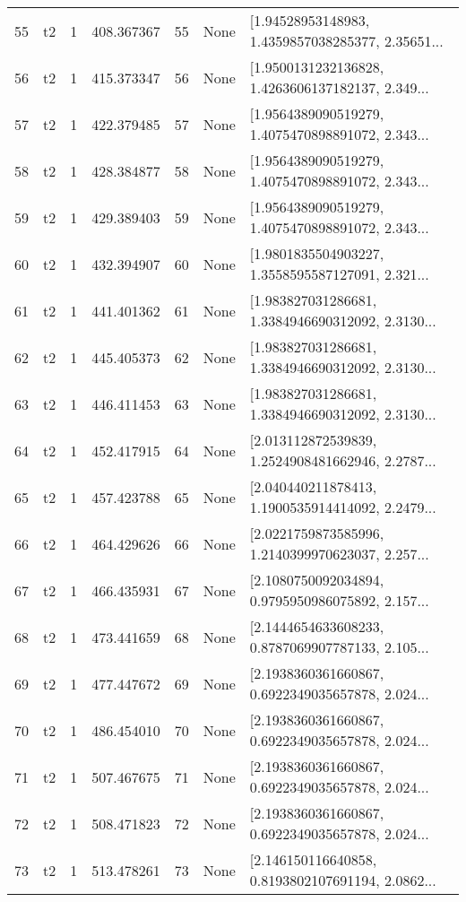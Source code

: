 \begin{tabular}{lllrlll}
55  &  t2 &   1 &   408.367367 &   55 &  None &  [1.94528953148983, 1.4359857038285377, 2.35651... \\
56  &  t2 &   1 &   415.373347 &   56 &  None &  [1.9500131232136828, 1.4263606137182137, 2.349... \\
57  &  t2 &   1 &   422.379485 &   57 &  None &  [1.9564389090519279, 1.4075470898891072, 2.343... \\
58  &  t2 &   1 &   428.384877 &   58 &  None &  [1.9564389090519279, 1.4075470898891072, 2.343... \\
59  &  t2 &   1 &   429.389403 &   59 &  None &  [1.9564389090519279, 1.4075470898891072, 2.343... \\
60  &  t2 &   1 &   432.394907 &   60 &  None &  [1.9801835504903227, 1.3558595587127091, 2.321... \\
61  &  t2 &   1 &   441.401362 &   61 &  None &  [1.983827031286681, 1.3384946690312092, 2.3130... \\
62  &  t2 &   1 &   445.405373 &   62 &  None &  [1.983827031286681, 1.3384946690312092, 2.3130... \\
63  &  t2 &   1 &   446.411453 &   63 &  None &  [1.983827031286681, 1.3384946690312092, 2.3130... \\
64  &  t2 &   1 &   452.417915 &   64 &  None &  [2.013112872539839, 1.2524908481662946, 2.2787... \\
65  &  t2 &   1 &   457.423788 &   65 &  None &  [2.040440211878413, 1.1900535914414092, 2.2479... \\
66  &  t2 &   1 &   464.429626 &   66 &  None &  [2.0221759873585996, 1.2140399970623037, 2.257... \\
67  &  t2 &   1 &   466.435931 &   67 &  None &  [2.1080750092034894, 0.9795950986075892, 2.157... \\
68  &  t2 &   1 &   473.441659 &   68 &  None &  [2.1444654633608233, 0.8787069907787133, 2.105... \\
69  &  t2 &   1 &   477.447672 &   69 &  None &  [2.1938360361660867, 0.6922349035657878, 2.024... \\
70  &  t2 &   1 &   486.454010 &   70 &  None &  [2.1938360361660867, 0.6922349035657878, 2.024... \\
71  &  t2 &   1 &   507.467675 &   71 &  None &  [2.1938360361660867, 0.6922349035657878, 2.024... \\
72  &  t2 &   1 &   508.471823 &   72 &  None &  [2.1938360361660867, 0.6922349035657878, 2.024... \\
73  &  t2 &   1 &   513.478261 &   73 &  None &  [2.146150116640858, 0.8193802107691194, 2.0862... \\

\end{tabular}
